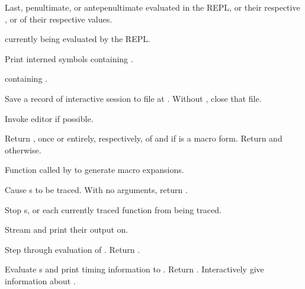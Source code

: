 \begin{LIST}{1cm}
  
  {
  Last, penultimate, or antepenultimate  evaluated in the REPL, or
  their respective , or  of their respective
  values. 
  }

  \IT{\kwd*{--}}
  {
   currently being evaluated by the REPL.
  }

  {
  Print interned symbols containing .
  }

  {
   containing .
  }

  {
  Save a record of interactive session to file at . Without
  , close that file.
  }

  {
  Invoke editor if possible.
  }

  {
  Return , once or entirely, respectively, of
   and \retvalii{\T} if  is a macro form. 
  Return  and \retvalii{\NIL} otherwise.
  }

  {
  Function called by  to generate macro expansions.
  }

  {
  Cause s to be traced. With no arguments,
  return .
  }

  {
  Stop s, or each currently traced function from being
  traced. 
  }

  {
  Stream  and  print their output on.
  }

  {
  Step through evaluation of . Return . 
  }

  {
  Evaluate s and print timing information to
  . Return . 
  }
  {
    Interactively give information about .
  }


\end{LIST}
